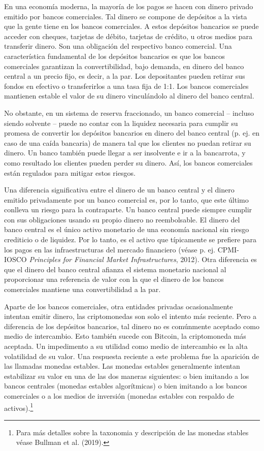 \documentclass[10pt,spanish]{article}
\begin{document}
En una economía moderna, la mayoría de los pagos se hacen con dinero
privado emitido por bancos comerciales. Tal dinero se compone de
depósitos a la vista que la gente tiene en los bancos comerciales. A
estos depósitos bancarios se puede acceder con cheques, tarjetas de
débito, tarjetas de crédito, u otros medios para transferir dinero. Son
una obligación del respectivo banco comercial. Una característica
fundamental de los depósitos bancarios es que los bancos comerciales
garantizan la convertibilidad, bajo demanda, en dinero del banco central
a un precio fijo, es decir, a la par. Los depositantes pueden retirar
sus fondos en efectivo o transferirlos a una tasa fija de 1:1. Los
bancos comerciales mantienen estable el valor de su dinero vinculándolo
al dinero del banco central.

No obstante, en un sistema de reserva fraccionado, un banco comercial
-- incluso siendo solvente -- puede no contar con la liquidez necesaria
para cumplir su promesa de convertir los depósitos bancarios en dinero
del banco central (p. ej. en caso de una caída bancaria) de manera tal
que los clientes no puedan retirar su dinero. Un banco también puede
llegar a ser insolvente e ir a la bancarrota, y como resultado los
clientes pueden perder su dinero. Así, los bancos comerciales están
regulados para mitigar estos riesgos.

Una diferencia significativa entre el dinero de un banco central y el
dinero emitido privadamente por un banco comercial es, por lo tanto, que
este último conlleva un riesgo para la contraparte. Un banco central
puede siempre cumplir con sus obligaciones usando su propio dinero no
reembolsable. El dinero del banco central es el único activo monetario
de una economía nacional sin riesgo crediticio o de liquidez. Por lo
tanto, es el activo que típicamente se prefiere para los pagos en las
infraestructuras del mercado financiero (véase p. ej. CPMI-IOSCO
\emph{Principles for Financial Market Infrastructures}, 2012). Otra
diferencia es que el dinero del banco central afianza el sistema
monetario nacional al proporcionar una referencia de valor con la que el
dinero de los bancos comerciales mantiene una convertibilidad a la par.

Aparte de los bancos comerciales, otra entidades privadas ocasionalmente
intentan emitir dinero, las criptomonedas son solo el intento más
reciente. Pero a diferencia de los depósitos bancarios, tal dinero no es
comúnmente aceptado como medio de intercambio. Esto también sucede con
Bitcoin, la criptomoneda más aceptada. Un impedimento a su utilidad como
medio de intercambio es la alta volatilidad de su valor. Una respuesta
reciente a este problema fue la aparición de las llamadas monedas
estables. Las monedas estables generalmente intentan estabilizar su
valor en una de las dos maneras siguientes: o bien imitando a los bancos
centrales (monedas estables algorítmicas) o bien imitando a los bancos
comerciales o a los medios de inversión (monedas estables con respaldo
de activos).\footnote{Para más detalles sobre la taxonomia y descripción
de las monedas stables véase Bullman et al. (2019).}
\end{document}
